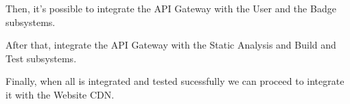 Then, it's possible to integrate the API Gateway with the User and the Badge subsystems.


\begin{adjustbox}{
        max size={\textwidth}{},
        caption={API Gateway subsystem step 2},
        label={fig:API Gateway subsystem step 2},
        figure=H}
    \centering
\end{adjustbox}

After that, integrate the API Gateway with the Static Analysis and Build and Test subsystems.

\begin{adjustbox}{
        max size={\textwidth}{},
        caption={API Gateway subsystem step 3},
        label={fig:API Gateway subsystem step 3},
        figure=H}
    \centering
\end{adjustbox}

Finally, when all is integrated and tested sucessfully we can proceed to integrate it with the Website CDN.

\begin{adjustbox}{
        max size={\textwidth}{},
        caption={API Gateway subsystem step 4},
        label={fig:API Gateway subsystem step 4},
        figure=H}
    \centering
\end{adjustbox}
